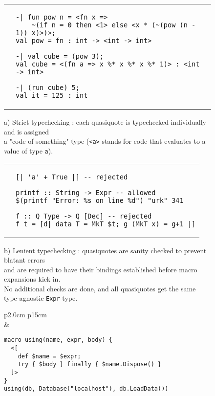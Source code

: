 \documentclass[10pt,journal,a4paper]{IEEEtran}
\begin{document}
\begin{figure*}[t]
\begin{listing}
\normalsize

\begin{tabular}{p{2.0cm} p{15cm}}\\
 &
\begin{verbatim}
-| fun pow n = <fn x =>
    ~(if n = 0 then <1> else <x * (~(pow (n - 1)) x)>)>;
val pow = fn : int -> <int -> int>

-| val cube = (pow 3);
val cube = <(fn a => x %* x %* x %* 1)> : <int -> int>

-| (run cube) 5;
val it = 125 : int
\end{verbatim}
\end{tabular}

\begin{adjustwidth}{2.5cm}{0pt}
a) Strict typechecking \cite{taha99}: each quasiquote is typechecked individually and is assigned\\
a "code of something" type (\small \texttt{<a>} \normalsize stands for code that evaluates to a
value of type \small \texttt{a})\normalsize.\\
\end{adjustwidth}

\begin{tabular}{p{2.0cm} p{15cm}}\\
 &
\begin{verbatim}
[| 'a' + True |] -- rejected

printf :: String -> Expr -- allowed
$(printf "Error: %s on line %d") "urk" 341

f :: Q Type -> Q [Dec] -- rejected
f t = [d| data T = MkT $t; g (MkT x) = g+1 |]
\end{verbatim}
\end{tabular}

\begin{adjustwidth}{2.5cm}{0pt}
b) Lenient typechecking \cite{sheard02}: quasiquotes are sanity checked to prevent blatant errors\\
and are required to have their bindings established before macro expansions kick in.\\
No additional checks are done, and all quasiquotes get the same type-agnostic
\small \texttt{Expr} \normalsize type.
\end{adjustwidth}

\begin{tabular}{p{2.0cm} p{15cm}}\\
 &
\begin{verbatim}
macro using(name, expr, body) {
  <[
    def $name = $expr;
    try { $body } finally { $name.Dispose() }
  ]>
}
using(db, Database("localhost"), db.LoadData())
\end{verbatim}
\end{tabular}


\end{listing}
\end{figure*}
\end{document}
